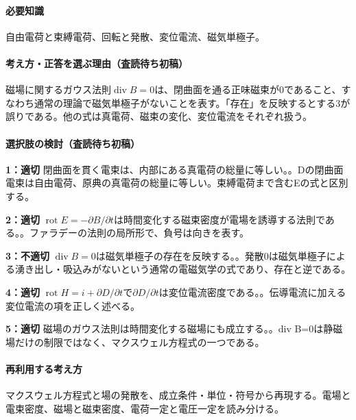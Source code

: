 \paragraph{必要知識} 自由電荷と束縛電荷、回転と発散、変位電流、磁気単極子。

\paragraph{考え方・正答を選ぶ理由（査読待ち初稿）} 磁場に関するガウス法則\(\operatorname{div}B=0\)は、閉曲面を通る正味磁束が0であること、すなわち通常の理論で磁気単極子がないことを表す。「存在」を反映するとする3が誤りである。他の式は真電荷、磁束の変化、変位電流をそれぞれ扱う。

\paragraph{選択肢の検討（査読待ち初稿）}\mbox{}\par

\noindent\textbf{1：適切} 閉曲面を貫く電束は、内部にある真電荷の総量に等しい。。Dの閉曲面電束は自由電荷、原典の真電荷の総量に等しい。束縛電荷まで含むEの式と区別する。\par

\noindent\textbf{2：適切} \(\operatorname{rot}E=-\partial B/\partial t\)は時間変化する磁束密度が電場を誘導する法則である。。ファラデーの法則の局所形で、負号は向きを表す。\par

\noindent\textbf{3：不適切} \(\operatorname{div}B=0\)は磁気単極子の存在を反映する。。発散0は磁気単極子による湧き出し・吸込みがないという通常の電磁気学の式であり、存在と逆である。\par

\noindent\textbf{4：適切} \(\operatorname{rot}H=i+\partial D/\partial t\)で\(\partial D/\partial t\)は変位電流密度である。。伝導電流に加える変位電流の項を正しく述べる。\par

\noindent\textbf{5：適切} 磁場のガウス法則は時間変化する磁場にも成立する。。div B=\allowbreak{}0は静磁場だけの制限ではなく、マクスウェル方程式の一つである。\par

\paragraph{再利用する考え方} マクスウェル方程式と場の発散を、成立条件・単位・符号から再現する。電場と電束密度、磁場と磁束密度、電荷一定と電圧一定を読み分ける。


